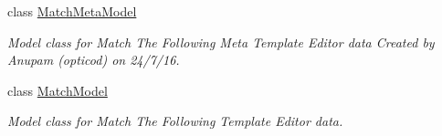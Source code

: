 \begin{DoxyCompactItemize}
class \hyperlink{classorg_1_1buildmlearn_1_1toolkit_1_1matchtemplate_1_1data_1_1MatchMetaModel}{Match\+Meta\+Model}
\begin{DoxyCompactList}\small\item\em Model class for Match The Following Meta Template Editor data Created by Anupam (opticod) on 24/7/16. \end{DoxyCompactList}\item 
class \hyperlink{classorg_1_1buildmlearn_1_1toolkit_1_1matchtemplate_1_1data_1_1MatchModel}{Match\+Model}
\begin{DoxyCompactList}\small\item\em Model class for Match The Following Template Editor data. \end{DoxyCompactList}\end{DoxyCompactItemize}
